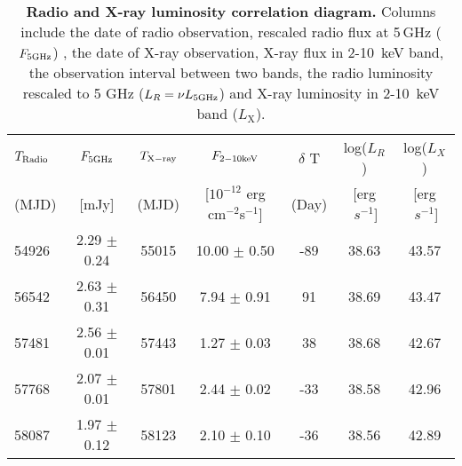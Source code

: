 \begin{table*}
\centering
\caption{{\bf Radio and X-ray luminosity correlation diagram.} Columns include the date of radio observation, rescaled radio flux at 5$\,$GHz ($F_{\rm{5GHz}}$)  , the date of X-ray observation,  X-ray flux in 2-10~keV band, the observation interval between two bands, the radio luminosity rescaled to 5 GHz ($L_R=\nu L_{\rm{5GHz}}$) and X-ray luminosity in 2-10~keV band ($L_\mathrm{X}$).}
\label{tab:radio_xray}
\begin{tabular}{lcccccc}
\hline
\hline

$T_{\rm Radio}$ & $F_{\rm 5GHz}$  & $T_{\rm X-ray}$  & $F_{2-10\rm keV}$ & $\delta$ T & log($L_{R}$) &log($L_{X}$) \\ 
(MJD) & [mJy]& (MJD) &[$10^{-12}$ erg cm$^{-2}$\rm{s}$^{-1}$]   &(Day)   & [erg$~s^{-1}$] &[erg$~s^{-1}$] \\
\hline

54926 & 2.29 $\pm$ 0.24 & 55015 & 10.00 $\pm$ 0.50 & -89 & 38.63 & 43.57 \\
56542 & 2.63 $\pm$ 0.31 & 56450 & 7.94 $\pm$ 0.91 & 91 & 38.69 & 43.47 \\
57481 & 2.56 $\pm$ 0.01 & 57443 & 1.27 $\pm$ 0.03 & 38 & 38.68 & 42.67 \\
57768 & 2.07 $\pm$ 0.01 & 57801 & 2.44 $\pm$ 0.02 & -33 & 38.58 & 42.96 \\
58087 & 1.97 $\pm$ 0.12 & 58123 & 2.10 $\pm$ 0.10 & -36 & 38.56 & 42.89 \\



 \hline
\end{tabular}\\
\end{table*}

